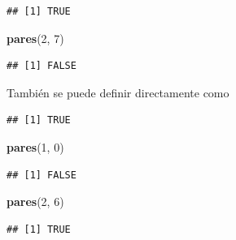 \documentclass[11pt,]{book}
\newenvironment{Shaded}{\begin{snugshade}}{\end{snugshade}}
\newcommand{\CommentTok}[1]{\textcolor[rgb]{0.37,0.37,0.37}{\textit{#1}}}
\newcommand{\ControlFlowTok}[1]{\textcolor[rgb]{0.27,0.27,0.27}{\textbf{#1}}}
\newcommand{\DecValTok}[1]{\textcolor[rgb]{0.06,0.06,0.06}{#1}}
\newcommand{\KeywordTok}[1]{\textcolor[rgb]{0.27,0.27,0.27}{\textbf{#1}}}
\newcommand{\NormalTok}[1]{#1}
\newcommand{\OperatorTok}[1]{\textcolor[rgb]{0.43,0.43,0.43}{\textbf{#1}}}
\newcommand{\StringTok}[1]{\textcolor[rgb]{0.5,0.5,0.5}{#1}}
\begin{document}
\begin{verbatim}
## [1] TRUE
\end{verbatim}

\begin{Shaded}
\begin{Highlighting}[]
\KeywordTok{pares}\NormalTok{(}\DecValTok{2}\NormalTok{, }\DecValTok{7}\NormalTok{)}
\end{Highlighting}
\end{Shaded}

\begin{verbatim}
## [1] FALSE
\end{verbatim}

También se puede definir directamente como

\begin{Shaded}
\end{Shaded}

\begin{verbatim}
## [1] TRUE
\end{verbatim}

\begin{Shaded}
\begin{Highlighting}[]
\KeywordTok{pares}\NormalTok{(}\DecValTok{1}\NormalTok{, }\DecValTok{0}\NormalTok{)}
\end{Highlighting}
\end{Shaded}

\begin{verbatim}
## [1] FALSE
\end{verbatim}

\begin{Shaded}
\begin{Highlighting}[]
\KeywordTok{pares}\NormalTok{(}\DecValTok{2}\NormalTok{, }\DecValTok{6}\NormalTok{)}
\end{Highlighting}
\end{Shaded}

\begin{verbatim}
## [1] TRUE
\end{verbatim}
\end{document}
